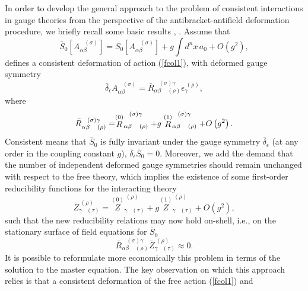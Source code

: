 \documentclass[a4paper,12pt]{article}
\begin{document}
In order to develop the general approach to the problem of consistent
interactions in gauge theories from the perspective of the
antibracket-antifield deformation procedure, we briefly recall some basic
results \cite{17and5}, \cite{21and5}. Assume that 
\begin{equation}
\bar{S}_{0}\left[ A_{\alpha \beta }^{\;\;\;(\sigma )}\right] =S_{0}\left[
A_{\alpha \beta }^{\;\;\;(\sigma )}\right] +g\int d^{n}x\,a_{0}+O\left(
g^{2}\right) ,  \label{fcol26}
\end{equation}
defines a consistent deformation of action (\ref{fcol1}), with deformed
gauge symmetry 
\begin{equation}
\bar{\delta}_{\epsilon }A_{\alpha \beta }^{\;\;\;(\sigma )}=\bar{R}_{\alpha
\beta \;\;\;\;(\rho )}^{\;\;\;(\sigma )\gamma }\epsilon _{\gamma }^{\;(\rho
)},  \label{defgsym}
\end{equation}
where 
\begin{equation}
\bar{R}_{\alpha \beta \;\;\;\;(\rho )}^{\;\;\;(\sigma )\gamma }=\stackrel{(0)%
}{R}_{\alpha \beta \;\;\;\;(\rho )}^{\;\;\;(\sigma )\gamma }+g\stackrel{(1)}{%
R}_{\alpha \beta \;\;\;\;(\rho )}^{\;\;\;(\sigma )\gamma }+O\left(
g^{2}\right) .  \label{fcol27}
\end{equation}
Consistent means that $\bar{S}_{0}$ is fully invariant under the gauge
symmetry $\bar{\delta}_{\epsilon }$ (at any order in the coupling constant $%
g $), $\bar{\delta}_{\epsilon }\bar{S}_{0}=0$. Moreover, we add the demand
that the number of independent deformed gauge symmetries should remain
unchanged with respect to the free theory, which implies the existence of
some first-order reducibility functions for the interacting theory 
\begin{equation}
\bar{Z}_{\gamma \;\;\;(\tau )}^{\;(\rho )}=\stackrel{(0)}{Z}_{\gamma
\;\;\;(\tau )}^{\;(\rho )}+g\stackrel{(1)}{Z}_{\gamma \;\;\;(\tau
)}^{\;(\rho )}+O\left( g^{2}\right) ,  \label{fcol28}
\end{equation}
such that the new reducibility relations may now hold on-shell, i.e., on the
stationary surface of field equations for $\bar{S}_{0}$%
\begin{equation}
\bar{R}_{\alpha \beta \;\;\;\;(\rho )}^{\;\;\;(\sigma )\gamma }\bar{Z}%
_{\gamma \;\;\;(\tau )}^{\;(\rho )}\approx 0.  \label{fcol29}
\end{equation}
It is possible to reformulate more economically this problem in terms of the
solution to the master equation. The key observation on which this approach
relies is that a consistent deformation of the free action (\ref{fcol1}) and
\end{document}
